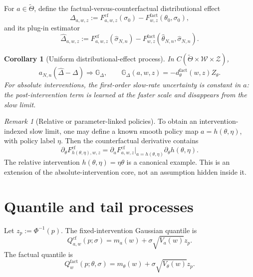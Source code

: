 \documentclass[11pt]{article}
\newtheorem{corollary}[assumption]{Corollary}
\theoremstyle{remark}
\newtheorem{remark}[assumption]{Remark}
\newcommand{\cf}{\mathrm{cf}}
\newcommand{\fact}{\mathrm{fact}}
\newcommand{\cW}{\mathcal W}
\newcommand{\cZ}{\mathcal Z}
\newcommand{\Ph}{\Phi}
\newcommand{\an}{a_{N,n}}
\newcommand{\thetahat}{\widehat\theta_{N,n}}
\newcommand{\sigmahat}{\widehat\sigma_{N,n}}
\begin{document}
For $a\in\widetilde\Theta$, define the factual-versus-counterfactual distributional effect
\begin{equation}\label{eq:Delta}
 \Delta_{a,w,z}
 :=F^{\cf}_{a,w,z}(\sigma_0)-F^{\fact}_{w,z}(\theta_0,\sigma_0),
\end{equation}
and its plug-in estimator
\[
 \widehat\Delta_{a,w,z}
 :=F^{\cf}_{a,w,z}(\sigmahat)
 -F^{\fact}_{w,z}(\thetahat,\sigmahat).
\]

\begin{corollary}[Uniform distributional-effect process]\label{cor:effect}
In $C(\widetilde\Theta\times\cW\times\cZ)$,
\begin{equation}\label{eq:effect-clt}
 \an(\widehat\Delta-\Delta)
 \Rightarrow \mathbb G_\Delta,
 \qquad
 \mathbb G_\Delta(a,w,z)
 =-d_\theta^{\fact}(w,z)Z_\theta.
\end{equation}
For absolute interventions, the first-order slow-rate uncertainty is constant in $a$: the post-intervention term is learned at the faster scale and disappears from the slow limit.
\end{corollary}

\begin{remark}[Relative or parameter-linked policies]\label{rem:linked}
To obtain an intervention-indexed slow limit, one may define a known smooth policy map $a=h(\theta,\eta)$, with policy label $\eta$.  Then the counterfactual derivative contains
\[
 \partial_\theta F^{\cf}_{h(\theta,\eta),w,z}
 =\partial_aF^{\cf}_{a,w,z}\big|_{a=h(\theta,\eta)}
 \partial_\theta h(\theta,\eta).
\]
The relative intervention $h(\theta,\eta)=\eta\theta$ is a canonical example.  This is an extension of the absolute-intervention core, not an assumption hidden inside it.
\end{remark}

\section{Quantile and tail processes}

Let $z_p:=\Ph^{-1}(p)$.  The fixed-intervention Gaussian quantile is
\begin{equation}\label{eq:Qcf}
 Q^{\cf}_{a,w}(p;\sigma)
 =m_a(w)+\sigma\sqrt{V_a(w)}z_p.
\end{equation}
The factual quantile is
\[
 Q^{\fact}_w(p;\theta,\sigma)
 =m_\theta(w)+\sigma\sqrt{V_\theta(w)}z_p.
\]
\end{document}
